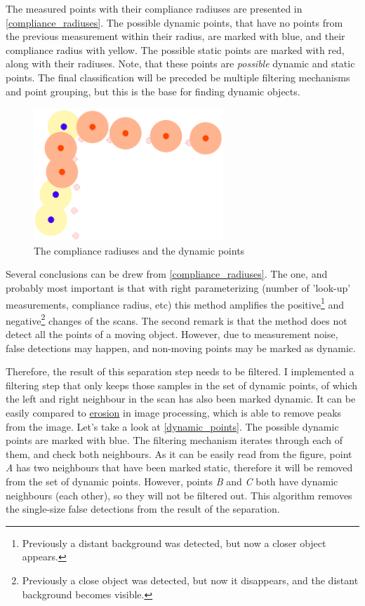 The measured points with their compliance radiuses are presented in \autoref{compliance_radiuses}. The possible dynamic points, that have no points from the previous measurement within their radius, are marked with blue, and their compliance radius with yellow. The possible static points are marked with red, along with their radiuses. Note, that these points are \textit{possible} dynamic and static points. The final classification will be preceded be multiple filtering mechanisms and point grouping, but this is the base for finding dynamic objects.

\begin{figure}[!ht]
    \centering
    \includegraphics[height=50mm]{figures/raw/compliance_radiuses.png}
    \caption{The compliance radiuses and the dynamic points}
    \label{compliance_radiuses}
\end{figure}

Several conclusions can be drew from \autoref{compliance_radiuses}. The one, and probably most important is that with right parameterizing (number of 'look-up' measurements, compliance radius, etc) this method amplifies the positive\footnote{Previously a distant background was detected, but now a closer object appears.} and negative\footnote{Previously a close object was detected, but now it disappears, and the distant background becomes visible.} changes of the scans. The second remark is that the method does not detect all the points of a moving object. However, due to measurement noise, false detections may happen, and non-moving points may be marked as dynamic.

Therefore, the result of this separation step needs to be filtered. I implemented a filtering step that only keeps those samples in the set of dynamic points, of which the left and right neighbour in the scan has also been marked dynamic. It can be easily compared to \href{https://en.wikipedia.org/wiki/Erosion_(morphology)}{erosion} in image processing, which is able to remove peaks from the image. Let's take a look at \autoref{dynamic_points}. The possible dynamic points are marked with blue. The filtering mechanism iterates through each of them, and check both neighbours. As it can be easily read from the figure, point \textit{A} has two neighbours that have been marked static, therefore it will be removed from the set of dynamic points. However, points \textit{B} and \textit{C} both have dynamic neighbours (each other), so they will not be filtered out. This algorithm removes the single-size false detections from the result of the separation.

